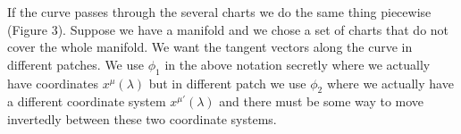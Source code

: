 \documentclass[11pt]{article}
\begin{document}
If the curve passes through the several charts we do the same thing piecewise (Figure 3). Suppose we have a manifold and we chose a set of charts that do not cover the whole manifold. We want the tangent vectors along the curve in different patches. We use $\phi_1$ in the above notation secretly where we actually have coordinates $x^\mu(\lambda)$ but in different patch we use $\phi_2$ where we actually have a different coordinate system $x^{\mu'}(\lambda)$ and there must be some way to move invertedly between these two coordinate systems.


    \begin{figure} [H]
        \begin{center}

\begin{tikzpicture}[x=0.75pt,y=0.75pt,yscale=-1,xscale=1]


\end{tikzpicture}
\end{center}
\end{figure}
\end{document}
